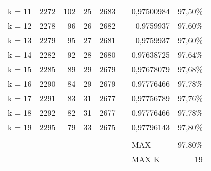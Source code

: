 \documentclass{article}
\begin{document}
\begin{table}[htbp]
\begin{tabular}{rrrrrrlr}
    \multicolumn{1}{l}{k = 11} & 2272  & 102   & 25    & 2683  &       & \multicolumn{1}{r}{0,97500984} & 97,50\% \\
    \multicolumn{1}{l}{k = 12} & 2278  & 96    & 26    & 2682  &       & \multicolumn{1}{r}{0,9759937} & 97,60\% \\
    \multicolumn{1}{l}{k = 13} & 2279  & 95    & 27    & 2681  &       & \multicolumn{1}{r}{0,9759937} & 97,60\% \\
    \multicolumn{1}{l}{k = 14} & 2282  & 92    & 28    & 2680  &       & \multicolumn{1}{r}{0,97638725} & 97,64\% \\
    \multicolumn{1}{l}{k = 15} & 2285  & 89    & 29    & 2679  &       & \multicolumn{1}{r}{0,97678079} & 97,68\% \\
    \multicolumn{1}{l}{k = 16} & 2290  & 84    & 29    & 2679  &       & \multicolumn{1}{r}{0,97776466} & 97,78\% \\
    \multicolumn{1}{l}{k = 17} & 2291  & 83    & 31    & 2677  &       & \multicolumn{1}{r}{0,97756789} & 97,76\% \\
    \multicolumn{1}{l}{k = 18} & 2292  & 82    & 31    & 2677  &       & \multicolumn{1}{r}{0,97776466} & 97,78\% \\
    \multicolumn{1}{l}{k = 19} & 2295  & 79    & 33    & 2675  &       & \multicolumn{1}{r}{0,97796143} & 97,80\% \\
          &       &       &       &       &       &       &  \\
          &       &       &       &       &       & MAX   & 97,80\% \\
          &       &       &       &       &       & MAX K & 19 \\
    \end{tabular}%
  \label{tab:addlabel}%
\end{table}%
\end{document}
